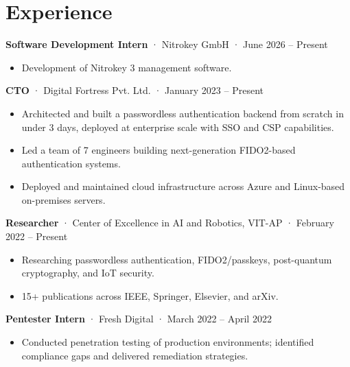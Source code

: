\documentclass[10pt, a4paper]{article}
\begin{document}
\section*{Experience}

\noindent\textbf{Software Development Intern} · Nitrokey GmbH · June 2026 -- Present
\begin{itemize}
    \item Development of Nitrokey 3 management software.
\end{itemize}

\vspace{4pt}

\noindent\textbf{CTO} · Digital Fortress Pvt. Ltd. · January 2023 -- Present
\begin{itemize}
    \item Architected and built a passwordless authentication backend from scratch in under 3 days, deployed at enterprise scale with SSO and CSP capabilities.
    \item Led a team of 7 engineers building next-generation FIDO2-based authentication systems.
    \item Deployed and maintained cloud infrastructure across Azure and Linux-based on-premises servers.
\end{itemize}

\vspace{4pt}

\noindent\textbf{Researcher} · Center of Excellence in AI and Robotics, VIT-AP · February 2022 -- Present
\begin{itemize}
    \item Researching passwordless authentication, FIDO2/passkeys, post-quantum cryptography, and IoT security.
    \item 15+ publications across IEEE, Springer, Elsevier, and arXiv.
\end{itemize}

\vspace{4pt}

\noindent\textbf{Pentester Intern} · Fresh Digital · March 2022 -- April 2022
\begin{itemize}
    \item Conducted penetration testing of production environments; identified compliance gaps and delivered remediation strategies.
\end{itemize}

\end{document}
